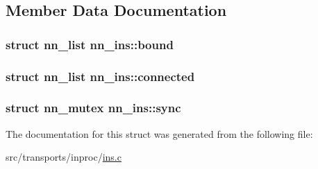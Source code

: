 \subsection{Member Data Documentation}
\subsubsection[{bound}]{\setlength{\rightskip}{0pt plus 5cm}struct {\bf nn\+\_\+list} nn\+\_\+ins\+::bound}\hypertarget{structnn__ins_ad379fd9cffdbb9be945cab8bfeb01e9e}{}\label{structnn__ins_ad379fd9cffdbb9be945cab8bfeb01e9e}
\subsubsection[{connected}]{\setlength{\rightskip}{0pt plus 5cm}struct {\bf nn\+\_\+list} nn\+\_\+ins\+::connected}\hypertarget{structnn__ins_a4b077905ad4f7970d6c67613daea6988}{}\label{structnn__ins_a4b077905ad4f7970d6c67613daea6988}
\subsubsection[{sync}]{\setlength{\rightskip}{0pt plus 5cm}struct {\bf nn\+\_\+mutex} nn\+\_\+ins\+::sync}\hypertarget{structnn__ins_a63ed8c2cce745f6dca202806f1db7301}{}\label{structnn__ins_a63ed8c2cce745f6dca202806f1db7301}


The documentation for this struct was generated from the following file\+:\begin{DoxyCompactItemize}
\item 
src/transports/inproc/\hyperlink{ins_8c}{ins.\+c}\end{DoxyCompactItemize}

